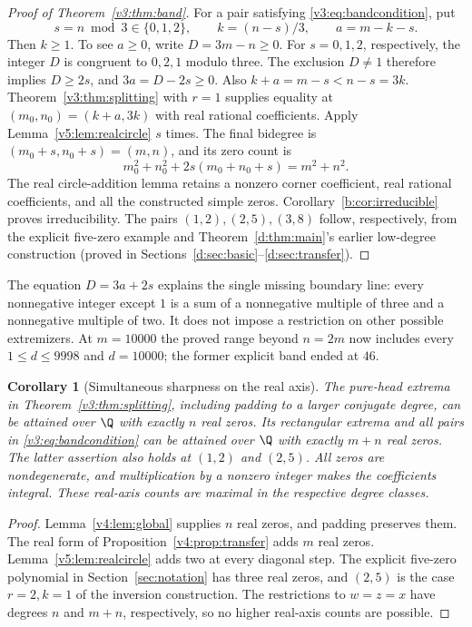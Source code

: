 \documentclass[UTF8,11pt]{ctexart}
\newtheorem{cor}[thm]{Corollary}
\theoremstyle{definition}
\numberwithin{equation}{section}
\begin{document}
\begin{proof}[Proof of Theorem~\ref{v3:thm:band}]
For a pair satisfying \eqref{v3:eq:bandcondition}, put
\begin{equation}\label{v4:eq:coneparameters}
 s=n\bmod3\in\{0,1,2\},\qquad
 k=(n-s)/3,\qquad a=m-k-s.
\end{equation}
Then $k\ge1$. To see $a\ge0$, write $D=3m-n\ge0$.
For $s=0,1,2$, respectively, the integer $D$ is congruent to
$0,2,1$ modulo three. The exclusion $D\ne1$ therefore implies
$D\ge2s$, and $3a=D-2s\ge0$.
Also $k+a=m-s<n-s=3k$.
Theorem~\ref{v3:thm:splitting} with $r=1$ supplies equality at
$(m_0,n_0)=(k+a,3k)$ with real rational coefficients. Apply
Lemma~\ref{v5:lem:realcircle} $s$ times. The final bidegree is
$(m_0+s,n_0+s)=(m,n)$, and its zero count is
\[
 m_0^2+n_0^2+2s(m_0+n_0+s)=m^2+n^2.
\]
The real circle-addition lemma retains a nonzero corner coefficient,
real rational coefficients, and all the constructed simple zeros.
Corollary~\ref{b:cor:irreducible} proves irreducibility.
The pairs $(1,2),(2,5),(3,8)$ follow, respectively, from the explicit
five-zero example and Theorem~\ref{d:thm:main}'s earlier low-degree
construction (proved in Sections~\ref{d:sec:basic}--\ref{d:sec:transfer}).
\end{proof}

The equation $D=3a+2s$ explains the single missing boundary line:
every nonnegative integer except $1$ is a sum of a nonnegative
multiple of three and a nonnegative multiple of two. It does not
impose a restriction on other possible extremizers.
At $m=10000$ the proved range beyond $n=2m$ now includes every
$1\le d\le9998$ and $d=10000$; the former explicit band ended at $46$.

\begin{cor}[Simultaneous sharpness on the real axis]\label{v5:cor:realaxis}
The pure-head extrema in Theorem~\ref{v3:thm:splitting}, including
padding to a larger conjugate degree, can be attained over $\Q$
with exactly $n$ real zeros. Its rectangular extrema and all pairs
in \eqref{v3:eq:bandcondition} can be attained over $\Q$ with
exactly $m+n$ real zeros. The latter assertion also holds at
$(1,2)$ and $(2,5)$. All zeros are nondegenerate, and multiplication
by a nonzero integer makes the coefficients integral.
These real-axis counts are maximal in the respective degree classes.
\end{cor}
\begin{proof}
Lemma~\ref{v4:lem:global} supplies $n$ real zeros, and padding
preserves them. The real form of Proposition~\ref{v4:prop:transfer}
adds $m$ real zeros. Lemma~\ref{v5:lem:realcircle} adds two
at every diagonal step. The explicit five-zero polynomial in
Section~\ref{sec:notation} has three real zeros, and $(2,5)$
is the case $r=2,k=1$ of the inversion construction.
The restrictions to $w=z=x$ have degrees $n$ and $m+n$,
respectively, so no higher real-axis counts are possible.
\end{proof}
\end{document}
